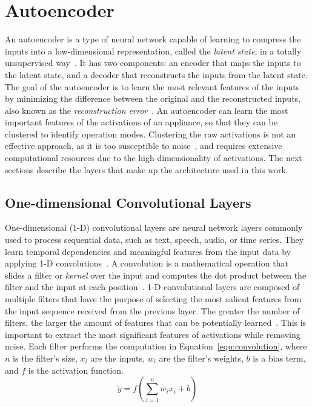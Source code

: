 \section{Autoencoder}

An autoencoder is a type of neural network capable of learning to compress the inputs into a low-dimensional representation, called the \textit{latent state}, in a totally unsupervised way~\parencite{hintonReducingDimensionalityData2006}. It has two components: an encoder that maps the inputs to the latent state, and a decoder that reconstructs the inputs from the latent state. The goal of the autoencoder is to learn the most relevant features of the inputs by minimizing the difference between the original and the reconstructed inputs, also known as the \textit{reconstruction error}~\parencite{hintonReducingDimensionalityData2006}. An autoencoder can learn the most important features of the activations of an appliance, so that they can be clustered to identify operation modes. Clustering the raw activations is not an effective approach, as it is too susceptible to noise~\parencite{castangiaClusteringApplianceOperation2023}, and requires extensive computational resources due to the high dimensionality of activations. The next sections describe the layers that make up the architecture used in this work.

\subsection{One-dimensional Convolutional Layers}

One-dimensional (1-D) convolutional layers are neural network layers commonly used to process sequential data, such as text, speech, audio, or time series. They learn temporal dependencies and meaningful features from the input data by applying 1-D convolutions~\parencite{kiranyaz1DConvolutionalNeural2021}. A convolution is a mathematical operation that slides a filter or \textit{kernel} over the input and computes the dot product between the filter and the input at each position~\parencite{rudinFunctionalAnalysis1991}. 1-D convolutional layers are composed of multiple filters that have the purpose of selecting the most salient features from the input sequence received from the previous layer. The greater the number of filters, the larger the amount of features that can be potentially learned~\parencite{castangiaClusteringApplianceOperation2023}. This is important to extract the most significant features of activations while removing noise. Each filter performs the computation in Equation~\eqref{equ:convolution}, where $n$ is the filter's size, $x_i$ are the inputs, $w_i$ are the filter's weights, $b$ is a bias term, and $f$ is the activation function.
\begin{equation}\label{equ:convolution}
  \tilde{y} = f(\sum_{i=1}^{n}{w_i x_i} + b)
\end{equation}

